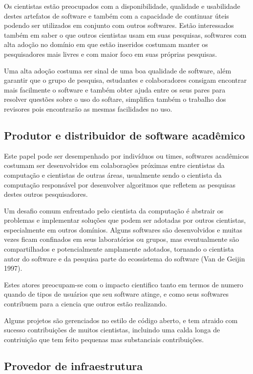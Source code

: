 Os cientistas estão preocupados com a disponibilidade, qualidade e usabilidade
destes artefatos de software e também com a capacidade de continuar úteis
podendo ser utilizados em conjunto com outros softwares. Estão interessados
também em saber o que outros cientistas usam em suas pesquisas, softwares com
alta adoção no domínio em que estão inseridos costumam manter os pesquisadores
mais livres e com maior foco em suas próprias pesquisas.

Uma alta adoção costuma ser sinal de uma boa qualidade de software, além
garantir que o grupo de pesquisa, estudantes e colaboradores consigam encontrar
mais facilmente o software e também obter ajuda entre os seus pares para
resolver questões sobre o uso do softare, simplifica também o trabalho dos
revisores pois encontrarão as mesmas facilidades no uso.

\subsection{Produtor e distribuidor de software acadêmico}

Este papel pode ser desempenhado por indivíduos ou times, softwares acadêmicos
costumam ser desenvolvidos em colaborações próximas entre cientistas da
computação e cientistas de outras áreas, usualmente sendo o cientista da
computação responsável por desenvolver algoritmos que refletem as pesquisas
destes outros pesquisadores.

Um desafio comum enfrentado pelo cientista da computação é abstrair os
problemas e implementar soluções que podem ser adotadas por outros cientistas,
especialmente em outros domínios. Alguns softwares são desenvolvidos e muitas
vezes ficam confinados em seus laboratórios ou grupos, mas eventualmente são
compartilhados e potencialmente amplamente adotados, tornando o cientista autor
do software e da pesquisa parte do ecossistema do software (Van de Geijin 1997).

Estes atores preocupam-se com o impacto cientifico tanto em termos de numero
quando de tipos de usuários que seu software atinge, e como seus softwares
contribuem para a ciencia que outros estão realizando.

Alguns projetos são gerenciados no estilo de código aberto, e tem atraido com
sucesso contribuições de muitos cientistas, incluindo uma calda longa de
contriuição que tem feito pequenas mas substanciais contribuições.

\subsection{Provedor de infraestrutura}

